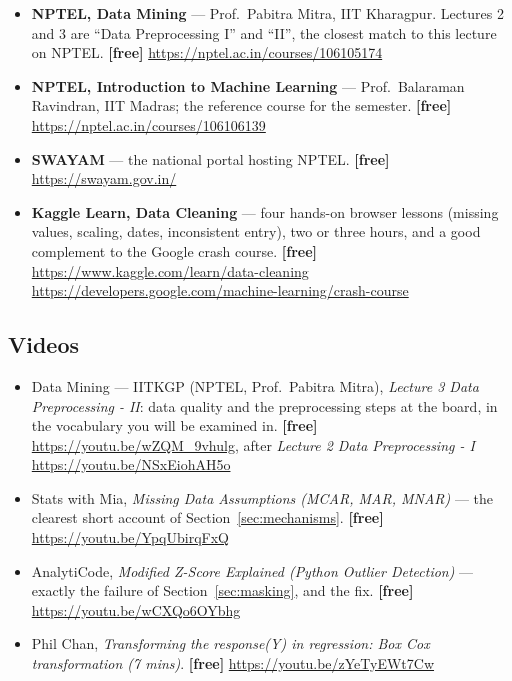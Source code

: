 \documentclass[11pt]{article}
\begin{document}
\begin{sloppypar}
\begin{itemize}[leftmargin=*]
  \item \textbf{NPTEL, Data Mining} --- Prof.\ Pabitra Mitra, IIT Kharagpur.
    Lectures 2 and 3 are ``Data Preprocessing I'' and ``II'', the closest
    match to this lecture on NPTEL. \textbf{[free]}
    \url{https://nptel.ac.in/courses/106105174}
  \item \textbf{NPTEL, Introduction to Machine Learning} --- Prof.\ Balaraman
    Ravindran, IIT Madras; the reference course for the semester.
    \textbf{[free]} \url{https://nptel.ac.in/courses/106106139}
  \item \textbf{SWAYAM} --- the national portal hosting NPTEL. \textbf{[free]}
    \url{https://swayam.gov.in/}
  \item \textbf{Kaggle Learn, Data Cleaning} --- four hands-on browser lessons
    (missing values, scaling, dates, inconsistent entry), two or three hours,
    and a good complement to the Google crash course. \textbf{[free]}
    \url{https://www.kaggle.com/learn/data-cleaning} \\
    \url{https://developers.google.com/machine-learning/crash-course}
\end{itemize}
\end{sloppypar}

\subsection*{Videos}

\begin{itemize}[leftmargin=*]
  \item Data Mining --- IITKGP (NPTEL, Prof.\ Pabitra Mitra), \emph{Lecture 3
    Data Preprocessing - II}: data quality and the preprocessing steps at the
    board, in the vocabulary you will be examined in. \textbf{[free]}
    \url{https://youtu.be/wZQM_9vhulg}, after \emph{Lecture 2 Data
    Preprocessing - I} \url{https://youtu.be/NSxEiohAH5o}
  \item Stats with Mia, \emph{Missing Data Assumptions (MCAR, MAR, MNAR)} ---
    the clearest short account of Section~\ref{sec:mechanisms}.
    \textbf{[free]} \url{https://youtu.be/YpqUbirqFxQ}
  \item AnalytiCode, \emph{Modified Z-Score Explained (Python Outlier
    Detection)} --- exactly the failure of Section~\ref{sec:masking}, and the
    fix. \textbf{[free]} \url{https://youtu.be/wCXQo6OYbhg}
  \item Phil Chan, \emph{Transforming the response(Y) in regression: Box Cox
    transformation (7 mins)}. \textbf{[free]}
    \url{https://youtu.be/zYeTyEWt7Cw}
\end{itemize}
\end{document}
